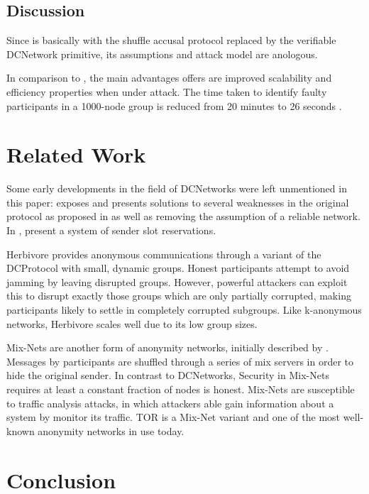 \subsection{Discussion}

Since \Verdict is basically \Dissent with the shuffle accusal protocol replaced by
the verifiable \ac{DCNetwork} primitive, its assumptions and attack model are anologous.

In comparison to \Dissent, the main advantages \Verdict offers are 
improved scalability and efficiency properties when under attack. The time taken to
identify faulty participants in a 1000-node group is reduced from 20 minutes to 26 seconds \cite{corrigan2013proactively}.


\section{Related Work}

Some early developments in the field of \acp{DCNetwork} were left unmentioned in this paper:
\cite{waidner1989dining} exposes and presents solutions to several weaknesses in the
original protocol as proposed in \cite{journals/joc/Chaum88} as well as removing the assumption
of a reliable network. In \cite{bos1990detection}, \citeauthor{bos1990detection} present a system of sender slot reservations.

Herbivore \cite{goel2003herbivore} provides anonymous communications through a variant of the
\ac{DCProtocol} with small, dynamic groups. Honest participants attempt to avoid jamming by
leaving disrupted groups. However, powerful attackers can exploit this to disrupt exactly those groups
which are only partially corrupted, making participants likely to settle in completely corrupted subgroups.
Like k-anonymous networks, Herbivore scales well due to its low group sizes.

Mix-Nets are another form of anonymity networks, initially described by \citeauthor{journals/cacm/Chaum81}
\cite{journals/cacm/Chaum81}. Messages by participants are shuffled through a series of mix servers
in order to hide the original sender. In contrast to \acp{DCNetwork}, Security in Mix-Nets requires
at least a constant fraction of nodes is honest. Mix-Nets are susceptible to traffic analysis attacks,
in which attackers able gain information about a system by monitor its traffic.
TOR \cite{conf/uss/DingledineMS04} is a Mix-Net variant and one of the most well-known anonymity networks
in use today.

\section{Conclusion}

